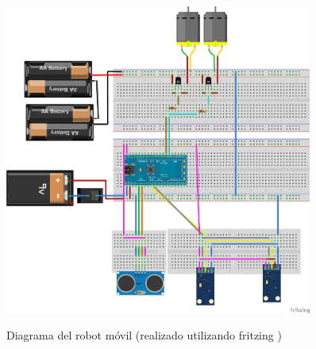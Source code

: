 
\begin{figure}[hbtp]
\begin{center}
  \caption{Diagrama del robot móvil
    (realizado utilizando fritzing \cite{fritzing})
  }
\includegraphics[width=0.9\textwidth]{graphs/breaboardbb.png}
\label{fig:breadboard}
\end{center}
\end{figure}


